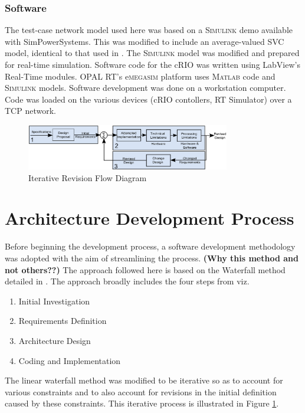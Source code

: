 \documentclass[conference]{IEEEtran}
\begin{document}
\subsubsection*{Software}
The test-case network model used here was based on a \textsc{Simulink} demo available with SimPowerSystems. This was modified to include an average-valued SVC model, identical to that used in \cite{PhasorPODImplement}. The \textsc{Simulink} model was modified and prepared for real-time simulation. Software code for the cRIO was written using LabView's Real-Time modules. OPAL RT's e\textsc{megasim} platform uses \textsc{Matlab} code and \textsc{Simulink} models. Software development was done on a workstation computer. Code was loaded on the various devices (cRIO contollers, RT Simulator) over a TCP network.\\

\begin{figure}[!t]
\centering
\includegraphics[width=3.5in]{RevisionFlow.png} 
\caption{Iterative Revision Flow Diagram}
\label{fig:RevisionFlow}
\end{figure}

\section{Architecture Development Process}\label{arch}

Before beginning the development process, a software development methodology was adopted with the aim of streamlining the process. \textbf{(Why this method and not others??)} The approach followed here is based on the Waterfall method detailed in \cite{WaterfallCoding}. The approach broadly includes the four steps from \cite{WaterfallCoding} viz. 

\begin{enumerate}
\item Initial Investigation
\item Requirements Definition
\item Architecture Design
\item Coding and Implementation
\end{enumerate}

The linear waterfall method was modified to be iterative so as to account for various constraints and to also account for revisions in the initial definition caused by these constraints. This iterative process is illustrated in Figure \ref{fig:RevisionFlow}.
\end{document}
